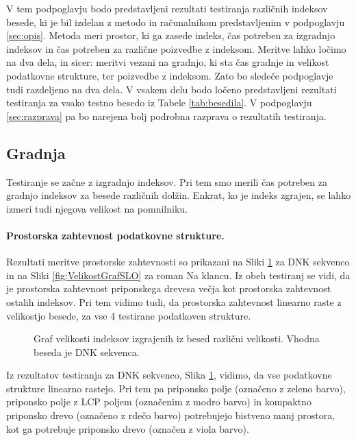V tem podpoglavju bodo predstavljeni rezultati testiranja različnih indeksov besede, ki je bil izdelan z metodo in računalnikom predstavljenim v podpoglavju \ref{sec:opis}. Metoda meri prostor, ki ga zasede indeks, čas potreben za izgradnjo indeksov in čas potreben za različne poizvedbe z indeksom. Meritve lahko ločimo na dva dela, in sicer: meritvi vezani na gradnjo, ki sta čas gradnje in velikost podatkovne strukture, ter poizvedbe z indeksom. Zato bo sledeče podpoglavje tudi razdeljeno na dva dela. V vsakem delu bodo ločeno predstavljeni rezultati testiranja za vsako testno besedo iz Tabele \ref{tab:besedila}. V podpoglavju \ref{sec:razprava} pa bo narejena bolj podrobna razprava o rezultatih testiranja.


\subsection{Gradnja}
Testiranje se začne z izgradnjo indeksov. Pri tem smo merili čas potreben za gradnjo indeksov za besede različnih dolžin. Enkrat, ko je indeks zgrajen, se lahko izmeri tudi njegova velikost na pomnilniku.

\paragraph{Prostorska zahtevnost podatkovne strukture.}

Rezultati meritve prostorske zahtevnosti so prikazani na Sliki \ref{fig:VelikostGraf} za DNK sekvenco in na Sliki \ref{fig:VelikostGrafSLO} za roman Na klancu. Iz obeh testiranj se vidi, da je prostorska zahtevnost priponskega drevesa večja kot prostorska zahtevnost ostalih indeksov. Pri tem vidimo tudi, da prostorska zahtevnost linearno raste z velikostjo besede, za vse 4 testirane podatkoven strukture.

\begin{figure}[htb]
    \centering
    
    \caption{Graf velikosti indeksov izgrajenih iz besed različni velikosti. Vhodna beseda je DNK sekvenca.} 
    \label{fig:VelikostGraf}
\end{figure}

Iz rezultatov testiranja za DNK sekvenco, Slika \ref{fig:VelikostGraf}, vidimo, da vse podatkovne strukture linearno rastejo. Pri tem pa priponsko polje (označeno z zeleno barvo), priponsko polje z LCP poljem (označenim z modro barvo) in kompaktno priponsko drevo (označeno z rdečo barvo) potrebujejo bistveno manj prostora, kot ga potrebuje priponsko drevo (označen z viola barvo).

